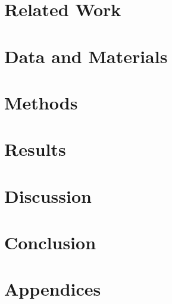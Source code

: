 \documentclass[a4paper,oneside,12pt]{book}
\begin{document}
\chapter{Related Work}


\chapter{Data and Materials}


\chapter{Methods}


\chapter{Results}


\chapter{Discussion}


\chapter{Conclusion}


\backmatter



\appendix
\chapter{Appendices}

\end{document}
